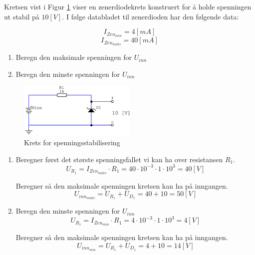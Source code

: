 \begin{question}[name=Oppgave, topic=zenerdioder]
Kretsen vist i Figur \ref{fig:zenKrets2} viser en zenerdiodekrets konstruert for å holde spenningen ut stabil på $10[V]$. I følge databladet til zenerdioden har den følgende data:

\[I_{Zen_{min}}= 4 [mA]\]
\[I_{Zen_{maks}}= 40 [mA]\]

\begin{enumerate}[label=\roman*)]
	\item Beregn den maksimale spenningen for $U_{inn}$
	\item Beregn den minste spenningen for $U_{inn}$
\end{enumerate}


\begin{figure}[H]
	\centering
	\includegraphics[width=0.5\textwidth]{diode/figurer/zenKrets2.png}
	\caption{Krets for spenningsstabilisering}
	\label{fig:zenKrets2}
\end{figure}

\end{question}

\vspace{0.5cm} %

\begin{solution}[name=Løsningsforslag oppgave]
\begin{enumerate}[label=\roman*)]
	\item Beregner først det største spenningsfallet vi kan ha over resistansen $R_1$.
\[U_{R_{1}}=I_{Zen_{maks}} \cdot R_1=40 \cdot 10^{-3} \cdot 1 \cdot 10^3= 40[V]\]

	Beregner så den maksimale spenningen kretsen kan ha på inngangen.
\[U_{inn_{maks}}=U_{R_{1}}+U_{D_{1}}=40+10=50 [V]\]

	\item Beregn den minste spenningen for $U_{inn}$
\[U_{R_{1}}=I_{Zen_{min}} \cdot R_1=4 \cdot 10^{-3} \cdot 1 \cdot 10^3= 4[V]\]

Beregner så den maksimale spenningen kretsen kan ha på inngangen.
\[U_{inn_{min}}=U_{R_{1}}+U_{D_{1}}=4+10=14 [V]\]

\end{enumerate}
\end{solution}


